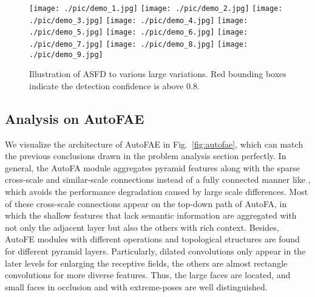 \documentclass[sigconf]{acmart}
\begin{document}
\begin{figure*}[!t]
    \centering
    \texttt{[image: ./pic/demo\_1.jpg]}
    \texttt{[image: ./pic/demo\_2.jpg]}
    \texttt{[image: ./pic/demo\_3.jpg]}
    \vfill
    \texttt{[image: ./pic/demo\_4.jpg]}
    \texttt{[image: ./pic/demo\_5.jpg]}
    \texttt{[image: ./pic/demo\_6.jpg]}
    \vfill
    \texttt{[image: ./pic/demo\_7.jpg]}
    \texttt{[image: ./pic/demo\_8.jpg]}
    \texttt{[image: ./pic/demo\_9.jpg]}
    \vfill
    \vspace{-2.5mm}
    \caption{Illustration of ASFD to various large variations. Red bounding boxes indicate the detection confidence is above $0.8$.}
    \vspace{-3mm}
    \label{fig:visual_demo}
\end{figure*}


\subsection{Analysis on AutoFAE}
We visualize the architecture of AutoFAE in Fig.~\ref{fig:autofae}, which can match the previous conclusions drawn in the problem analysis section perfectly. 
In general, the AutoFA module aggregates pyramid features along with the sparse cross-scale and similar-scale connections instead of a fully connected manner like \cite{xu2019autofpn,wang2019nasfcos}, which avoids the performance degradation caused by large scale differences. 
Most of these cross-scale connections appear on the top-down path of AutoFA, in which the shallow features that lack semantic information are aggregated with not only the adjacent layer but also the others with rich context. 
Besides, AutoFE modules with different operations and topological structures are found for different pyramid layers. Particularly, dilated convolutions only appear in the later levels for enlarging the receptive fields, the others are almost rectangle convolutions for more diverse features. Thus, the large faces are located, and small faces in occlusion and with extreme-poses are well distinguished.
\end{document}
